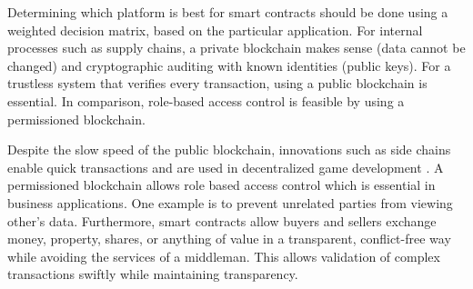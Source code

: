 \documentclass[12pt]{scrartcl}
\begin{document}


Determining which platform is best for smart contracts should be done using a weighted decision matrix, based on the particular application. For internal processes such as supply chains, a private blockchain makes sense (data cannot be changed) and cryptographic auditing with known identities (public keys). For a trustless system that verifies every transaction, using a public blockchain is essential. In comparison, role-based access control is feasible by using a permissioned blockchain. \hfill \break

Despite the slow speed of the public blockchain, innovations such as side chains enable quick transactions and are used in decentralized game development \cite{loomNetwork:Online}. A permissioned blockchain allows role based access control which is essential in business applications. One example is to prevent unrelated parties from viewing other's data. 	Furthermore, smart contracts allow buyers and sellers exchange money, property, shares, or anything of value in a transparent, conflict-free way while avoiding the services of a middleman. This allows validation of complex transactions swiftly while maintaining transparency.
\end{document}
